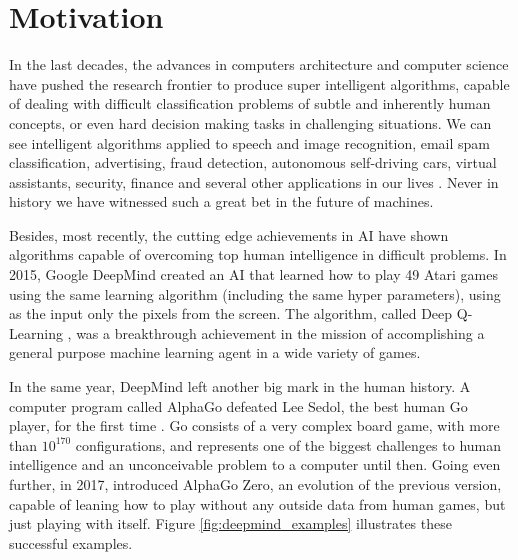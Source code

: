 \section{Motivation}


In the last decades, the advances in computers architecture and computer science have pushed the research frontier to produce super intelligent algorithms, capable of dealing with difficult classification problems of subtle and inherently human concepts, or even hard decision making tasks in challenging situations. We can see intelligent algorithms applied to speech and image recognition, email spam classification, advertising, fraud detection, autonomous self-driving cars, virtual assistants, security, finance and several other applications in our lives \cite{AIapplications}. Never in history we have witnessed such a great bet in the future of machines.


Besides, most recently, the cutting edge achievements in AI have shown algorithms capable of overcoming top human intelligence in difficult problems. In 2015, Google DeepMind created an AI that learned how to play 49 Atari games using the same learning algorithm (including the same hyper parameters), using as the input only the pixels from the screen. The algorithm, called Deep Q-Learning \cite{RLNature2015}, was a breakthrough achievement in the mission of accomplishing a general purpose machine learning agent in a wide variety of games.

In the same year, DeepMind left another big mark in the human history. A computer program called AlphaGo defeated Lee Sedol, the best human Go player, for the first time \cite{Silver_2016}. Go consists of a very complex board game, with more than $10^{170}$ configurations, and represents one of the biggest challenges to human intelligence and an unconceivable problem to a computer until then. Going even further, in 2017,  introduced AlphaGo Zero, an evolution of the previous version, capable of leaning how to play without any outside data from human games, but just playing with itself. Figure \ref{fig:deepmind_examples} illustrates these successful examples.

